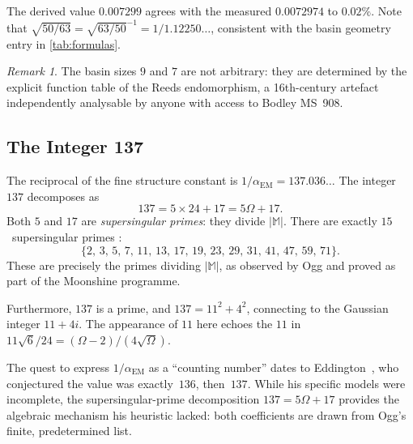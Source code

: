 \documentclass[11pt,a4paper]{article}
\theoremstyle{plain}
\theoremstyle{remark}
\newtheorem{remark}[theorem]{Remark}
\renewcommand{\Omega}{\varOmega}
\newcommand{\abs}[1]{\lvert #1 \rvert}
\newcommand{\aEM}{\alpha_{\mathrm{EM}}}
\begin{document}
The derived value $0.007299$ agrees with the measured
$0.0072974$ to $0.02\%$.  Note that $\sqrt{50/63} = \sqrt{63/50}^{-1}
= 1/1.12250\ldots$, consistent with the basin geometry entry in
\cref{tab:formulas}.

\begin{remark}
The basin sizes $9$ and $7$ are not arbitrary: they are determined by
the explicit function table of the Reeds endomorphism, a 16th-century
artefact independently analysable by anyone with access to
Bodley MS~908.
\end{remark}

\subsection{The Integer 137}
\label{sec:fine-137}

The reciprocal of the fine structure constant is $1/\aEM = 137.036\ldots$
The integer $137$ decomposes as
\[
  137 = 5\times 24 + 17 = 5\Omega + 17.
\]
Both $5$ and $17$ are \emph{supersingular primes}: they divide
$\abs{\mathbb{M}}$.  There are exactly $15$~supersingular primes
\cite{ogg1975}:
\[
  \{2,\,3,\,5,\,7,\,11,\,13,\,17,\,19,\,23,\,29,\,31,\,41,\,47,\,59,\,71\}.
\]
These are precisely the primes dividing $\abs{\mathbb{M}}$, as observed
by Ogg and proved as part of the Moonshine programme.

Furthermore, $137$ is a prime, and $137 = 11^2 + 4^2$, connecting to
the Gaussian integer $11+4i$.  The appearance of $11$ here echoes the
$11$ in $11\sqrt{6}/24 = (\Omega-2)/(4\sqrt{\Omega})$.

The quest to express $1/\aEM$ as a ``counting number'' dates to
Eddington~\cite{eddington1936}, who conjectured the value was
exactly~$136$, then~$137$.  While his specific models were incomplete,
the supersingular-prime decomposition $137 = 5\Omega + 17$ provides the
algebraic mechanism his heuristic lacked: both coefficients are drawn
from Ogg's finite, predetermined list.
\end{document}
